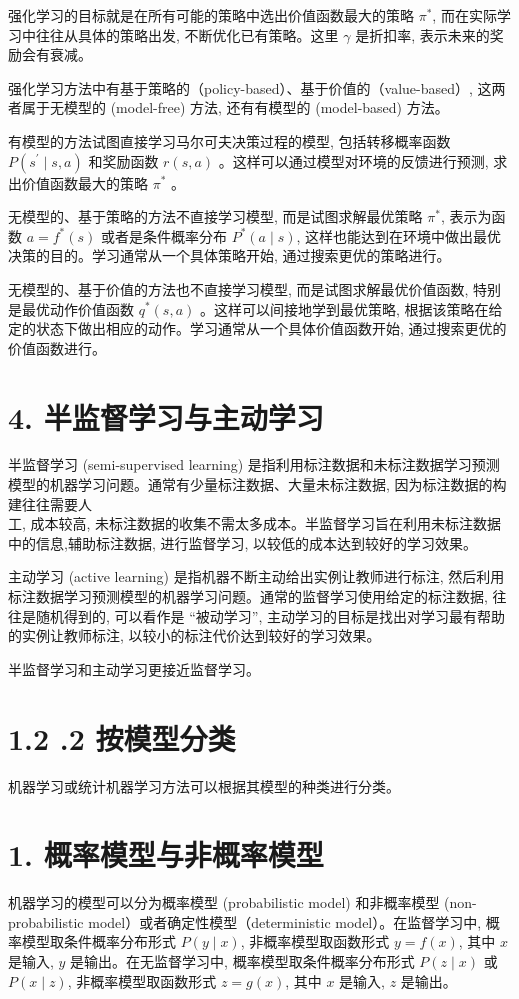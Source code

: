 \documentclass[10pt]{article}
\begin{document}
\begin{CJK*}{UTF8}{bsmi}
强化学习的目标就是在所有可能的策略中选出价值函数最大的策略 $\pi^{*}$, 而在实际学习中往往从具体的策略出发, 不断优化已有策略。这里 $\gamma$ 是折扣率, 表示未来的奖励会有衰减。

强化学习方法中有基于策略的（policy-based）、基于价值的（value-based）, 这两者属于无模型的 (model-free) 方法, 还有有模型的 (model-based) 方法。

有模型的方法试图直接学习马尔可夫决策过程的模型, 包括转移概率函数 $P\left(s^{\prime} \mid s, a\right)$ 和奖励函数 $r(s, a)$ 。这样可以通过模型对环境的反馈进行预测, 求出价值函数最大的策略 $\pi^{*}$ 。

无模型的、基于策略的方法不直接学习模型, 而是试图求解最优策略 $\pi^{*}$, 表示为函数 $a=f^{*}(s)$ 或者是条件概率分布 $P^{*}(a \mid s)$, 这样也能达到在环境中做出最优决策的目的。学习通常从一个具体策略开始, 通过搜索更优的策略进行。

无模型的、基于价值的方法也不直接学习模型, 而是试图求解最优价值函数, 特别是最优动作价值函数 $q^{*}(s, a)$ 。这样可以间接地学到最优策略, 根据该策略在给定的状态下做出相应的动作。学习通常从一个具体价值函数开始, 通过搜索更优的价值函数进行。

\section*{4. 半监督学习与主动学习}
半监督学习 (semi-supervised learning) 是指利用标注数据和未标注数据学习预测模型的机器学习问题。通常有少量标注数据、大量未标注数据, 因为标注数据的构建往往需要人\\
工, 成本较高, 未标注数据的收集不需太多成本。半监督学习旨在利用未标注数据中的信息,辅助标注数据, 进行监督学习, 以较低的成本达到较好的学习效果。

主动学习 (active learning) 是指机器不断主动给出实例让教师进行标注, 然后利用标注数据学习预测模型的机器学习问题。通常的监督学习使用给定的标注数据, 往往是随机得到的, 可以看作是 “被动学习”, 主动学习的目标是找出对学习最有帮助的实例让教师标注, 以较小的标注代价达到较好的学习效果。

半监督学习和主动学习更接近监督学习。

\section*{1.2 .2 按模型分类}
机器学习或统计机器学习方法可以根据其模型的种类进行分类。

\section*{1. 概率模型与非概率模型}
机器学习的模型可以分为概率模型 (probabilistic model) 和非概率模型 (non-probabilistic model）或者确定性模型（deterministic model）。在监督学习中, 概率模型取条件概率分布形式 $P(y \mid x)$, 非概率模型取函数形式 $y=f(x)$, 其中 $x$ 是输入, $y$ 是输出。在无监督学习中, 概率模型取条件概率分布形式 $P(z \mid x)$ 或 $P(x \mid z)$, 非概率模型取函数形式 $z=g(x)$, 其中 $x$ 是输入, $z$ 是输出。


\end{CJK*}
\end{document}
